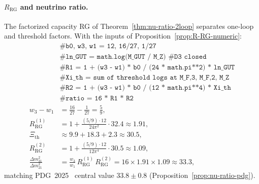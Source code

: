 \paragraph{$R_{\mathrm{RG}}$ and neutrino ratio.}
The factorized capacity RG of Theorem~\ref{thm:nu-ratio-2loop} separates
one-loop and threshold factors. With the inputs of
Proposition~\ref{prop:R-RG-numeric}:
\begin{equation}\label{eq:workbook-R-RG}
\begin{aligned}
  &\texttt{\# b0, w3, w1 = 12, 16/27, 1/27}\\
  &\texttt{\# ln\_GUT = math.log(M\_GUT / M\_Z)  \# D3 closed}\\
  &\texttt{\# R1 = 1 + (w3 - w1) * b0 / (24 * math.pi**2) * ln\_GUT}\\
  &\texttt{\# Xi\_th = sum of threshold logs at M\_F,3, M\_F,2, M\_Z}\\
  &\texttt{\# R2 = 1 + (w3 - w1) * b0 / (12 * math.pi**4) * Xi\_th}\\
  &\texttt{\# ratio = 16 * R1 * R2}\\
  w_3-w_1 &= \frac{16}{27}-\frac{1}{27}=\frac{5}{9},\\
  R_{\mathrm{RG}}^{(1)}
  &= 1+\frac{(5/9)\cdot 12}{24\pi^2}\cdot 32.4
  \approx 1.91,\\
  \Xi_{\mathrm{th}} &\approx 9.9+18.3+2.3 \approx 30.5,\\
  R_{\mathrm{RG}}^{(2)}
  &= 1+\frac{(5/9)\cdot 12}{12\pi^4}\cdot 30.5
  \approx 1.09,\\
  \frac{\Delta m^2_{31}}{\Delta m^2_{21}}
  &= \frac{w_3}{w_1}\,R_{\mathrm{RG}}^{(1)}\,R_{\mathrm{RG}}^{(2)}
  = 16\times 1.91\times 1.09
  \approx 33.3,
\end{aligned}
\end{equation}
matching PDG~2025~\cite{PDG2025} central value $33.8\pm 0.8$
(Proposition~\ref{prop:nu-ratio-pdg}).

